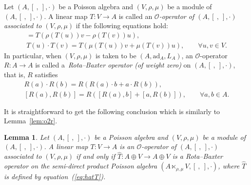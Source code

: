 \documentclass[10pt,a4paper]{amsart}
\numberwithin{equation}{section}
\newtheorem{Lemma}[Theorem]{Lemma}
\newcommand{\ad}{\mathrm{ad}}
\begin{document}
\begin{Definition}
 Let $(A, [\ ,\ ], \cdot)$ be a Poisson algebra and $(V, \rho, \mu)$ be a module of $(A, [\ ,\ ], \cdot)$.
 A linear map $T\colon V \to A$ is called an \textit{$\mathcal{O}$-operator of $(A, [\ ,\ ], \cdot)$ associated to $(V, \rho, \mu)$} if the following equations hold:
 \begin{gather*}
 [T(u), T(v)] = T(\rho(T(u))v - \rho(T(v))u),\\ %
 T(u) \cdot T(v) = T(\mu(T(u))v+ \mu(T(v))u), \qquad
 \forall u, v \in V. %
 \end{gather*}
	In particular, when $(V, \rho, \mu)$ is taken to be $(A, \ad_A, L_A)$, an $\mathcal O$-operator $R\colon A \to A$ is called a~\textit{Rota--Baxter operator (of weight zero)} on $(A, [\ ,\ ], \cdot)$, that is, $R$ satisfies
	\begin{gather*}
 	 R(a) \cdot R(b) = R(R(a) \cdot b + a \cdot R(b)),\\
 [R(a), R(b)] = R([R(a), b] + [a, R(b)]), \qquad \forall a, b \in A.
	\end{gather*}
\end{Definition}

It is straightforward to get the following conclusion which is similarly to Lemma~\ref{lem:o2r}.

\begin{Lemma}\label{lem:o2rp}
 Let $(A, [\ ,\ ], \cdot)$ be a Poisson algebra and $(V, \rho, \mu)$ be a module of $(A, [\ ,\ ], \cdot)$.
 A linear map $T\colon V \to A$ is an $\mathcal{O}$-operator of $(A, [\ ,\ ], \cdot)$ associated to $(V, \rho, \mu)$ if and only if $\hat T\colon A \oplus V \to A \oplus V$ is a Rota--Baxter operator on the semi-direct product Poisson algebra $(A \ltimes_{\rho, \mu} V, [\ ,\ ], \cdot)$, where $\hat T$ is defined by equation~{\rm (\ref{eq:hatT})}.
\end{Lemma}
\end{document}
